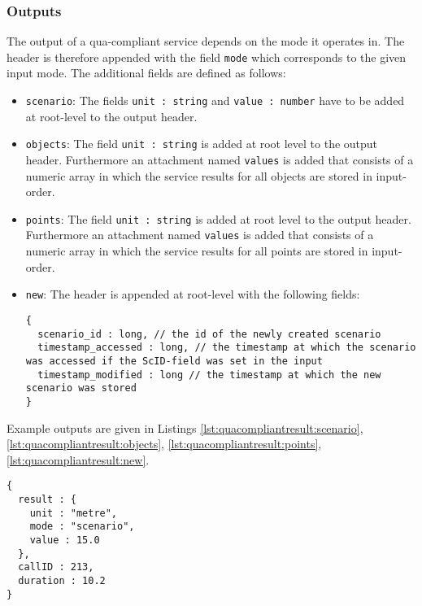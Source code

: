 \subsubsection{Outputs}
The output of a qua-compliant service depends on the mode it operates in. The header is therefore appended with the field \texttt{mode} which corresponds to the given input mode. The additional fields are defined as follows:

\begin{itemize}
  \item \texttt{scenario}: The fields \texttt{unit : string} and \texttt{value : number} have to be added at root-level to the output header.

  \item \texttt{objects}: The field \texttt{unit : string} is added at root level to the output header. Furthermore an attachment named \texttt{values} is added that consists of a numeric array in which the service results for all objects are stored in input-order.

  \item \texttt{points}: The field \texttt{unit : string} is added at root level to the output header. Furthermore an attachment named \texttt{values} is added that consists of a numeric array in which the service results for all points are stored in input-order.

  \item \texttt{new}: The header is appended at root-level with the following fields:
  \begin{lstlisting}
{
  scenario_id : long, // the id of the newly created scenario
  timestamp_accessed : long, // the timestamp at which the scenario was accessed if the ScID-field was set in the input
  timestamp_modified : long // the timestamp at which the new scenario was stored
}
  \end{lstlisting}
\end{itemize}

Example outputs are given in Listings \ref{lst:quacompliantresult:scenario}, \ref{lst:quacompliantresult:objects}, \ref{lst:quacompliantresult:points}, \ref{lst:quacompliantresult:new}.

\begin{lstlisting}[caption={A qua-compliant service output for mode \texttt{scenario}}, label={lst:quacompliantresult:scenario}]
{
  result : {
    unit : "metre",
    mode : "scenario",
    value : 15.0
  },
  callID : 213,
  duration : 10.2
}
\end{lstlisting}

